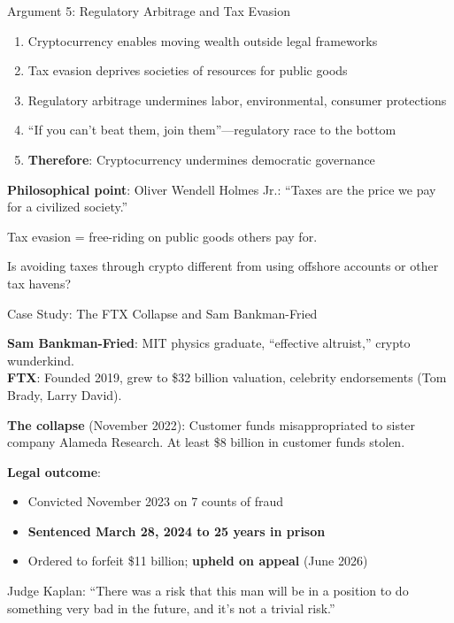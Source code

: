 ﻿\documentclass[aspectratio=169,11pt]{beamer}
\begin{document}
\begin{frame}[shrink=8]{Argument 5: Regulatory Arbitrage and Tax Evasion}
\begin{argumentbox}
\begin{enumerate}
    \item Cryptocurrency enables moving wealth outside legal frameworks
    \item Tax evasion deprives societies of resources for public goods
    \item Regulatory arbitrage undermines labor, environmental, consumer protections
    \item ``If you can't beat them, join them''---regulatory race to the bottom
    \item \textbf{Therefore}: Cryptocurrency undermines democratic governance
\end{enumerate}
\end{argumentbox}

\vspace{0.3em}
\textbf{Philosophical point}: Oliver Wendell Holmes Jr.: ``Taxes are the price we pay for a civilized society.''

Tax evasion = free-riding on public goods others pay for.

\begin{discussionbox}[Discussion]
Is avoiding taxes through crypto different from using offshore accounts or other tax havens?
\end{discussionbox}
\end{frame}

\begin{frame}{Case Study: The FTX Collapse and Sam Bankman-Fried}
\begin{casestudybox}
\textbf{Sam Bankman-Fried}: MIT physics graduate, ``effective altruist,'' crypto wunderkind.\\
\textbf{FTX}: Founded 2019, grew to \$32 billion valuation, celebrity endorsements (Tom Brady, Larry David).
\end{casestudybox}

\vspace{0.3em}
\textbf{The collapse} (November 2022): Customer funds misappropriated to sister company Alameda Research. At least \$8 billion in customer funds stolen.

\textbf{Legal outcome}:
\begin{itemize}
    \item Convicted November 2023 on 7 counts of fraud
    \item \textbf{Sentenced March 28, 2024 to 25 years in prison}
    \item Ordered to forfeit \$11 billion; \textbf{upheld on appeal} (June 2026)
\end{itemize}

Judge Kaplan: ``There was a risk that this man will be in a position to do something very bad in the future, and it's not a trivial risk.''
\end{frame}
\end{document}
